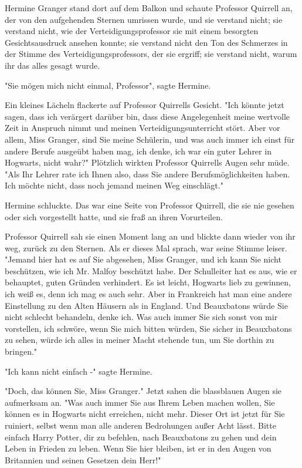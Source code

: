 {Hermine Granger stand dort auf dem Balkon und schaute Professor Quirrell an, der von den aufgehenden Sternen umrissen wurde, und sie verstand nicht; sie verstand nicht, wie der Verteidigungsprofessor sie mit einem besorgten Gesichtsausdruck ansehen konnte; sie verstand nicht den Ton des Schmerzes in der Stimme des Verteidigungsprofessors, der sie ergriff; sie verstand nicht, warum ihr das alles gesagt wurde.

"Sie mögen mich nicht einmal, Professor", sagte Hermine.

Ein kleines Lächeln flackerte auf Professor Quirrells Gesicht. "Ich könnte jetzt sagen, dass ich verärgert darüber bin, dass diese Angelegenheit meine wertvolle Zeit in Anspruch nimmt und meinen Verteidigungsunterricht stört. Aber vor allem, Miss Granger, sind Sie meine Schülerin, und was auch immer ich einst für andere Berufe ausgeübt haben mag, ich denke, ich war ein guter Lehrer in Hogwarts, nicht wahr?" Plötzlich wirkten Professor Quirrells Augen sehr müde.\\ "Als Ihr Lehrer rate ich Ihnen also, dass Sie andere Berufsmöglichkeiten haben. Ich möchte nicht, dass noch jemand meinen Weg einschlägt."

Hermine schluckte. Das war eine Seite von Professor Quirrell, die sie nie gesehen oder sich vorgestellt hatte, und sie fraß an ihren Vorurteilen.

Professor Quirrell sah sie einen Moment lang an und blickte dann wieder von ihr weg, zurück zu den Sternen. Als er dieses Mal sprach, war seine Stimme leiser. "Jemand hier hat es auf Sie abgesehen, Miss Granger, und ich kann Sie nicht beschützen, wie ich Mr. Malfoy beschützt habe. Der Schulleiter hat es aus, wie er behauptet, guten Gründen verhindert. Es ist leicht, Hogwarts lieb zu gewinnen, ich weiß es, denn ich mag es auch sehr. Aber in Frankreich hat man eine andere Einstellung zu den Alten Häusern als in England. Und Beauxbatons würde Sie nicht schlecht behandeln, denke ich. Was auch immer Sie sich sonst von mir vorstellen, ich schwöre, wenn Sie mich bitten würden, Sie sicher in Beauxbatons zu sehen, würde ich alles in meiner Macht stehende tun, um Sie dorthin zu bringen."

"Ich kann nicht einfach -" sagte Hermine.

"Doch, das können Sie, Miss Granger." Jetzt sahen die blassblauen Augen sie aufmerksam an. "Was auch immer Sie aus Ihrem Leben machen wollen, Sie können es in Hogwarts nicht erreichen, nicht mehr. Dieser Ort ist jetzt für Sie ruiniert, selbst wenn man alle anderen Bedrohungen außer Acht lässt. Bitte einfach Harry Potter, dir zu befehlen, nach Beauxbatons zu gehen und dein Leben in Frieden zu leben. Wenn Sie hier bleiben, ist er in den Augen von Britannien und seinen Gesetzen dein Herr!"

}
